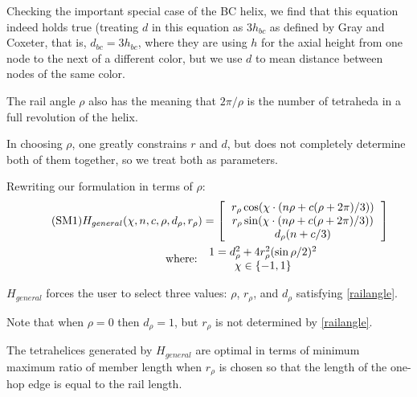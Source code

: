 \documentclass[review]{siamonline1116}
\newcommand\numberthis{\addtocounter{equation}{1}\tag{\theequation}}
\begin{document}
Checking the important special case of the BC helix, we find that this equation
indeed holds true (treating $d$ in this equation as $3 h_{bc}$ as defined by
Gray and Coxeter, that is, $d_{bc} = 3h_{bc}$, where they are using
$h$ for the axial height from one node to
the next of a different color, but we use $d$ to mean distance between nodes of
the  same color.

The rail angle $\rho$ also has the meaning that $2 \pi / \rho$ is the number of
tetraheda in a full revolution of the helix.

In choosing $\rho$, one greatly constrains $r$ and $d$, but does not completely
determine both of them together, so we treat both as parameters.

Rewriting our formulation in terms of $\rho$:
\begin{align*}
\numberthis  \label{eq:general}  
H_{general}(\chi,n,c,\rho,d_{\rho},r_{\rho}) &= 
 \left [
  \begin{tabular}{c}
   $ r_{\rho} \cos(\chi \cdot (n \rho + c(\rho +  2 \pi) /3)) $\\
   $ r_{\rho}  \sin(\chi \cdot (n \rho + c(\rho +  2 \pi) /3)) $\\
   $ d_{\rho} (n + c /3) $
  \end{tabular}
  \right ] \\
\text{where: } &
\begin{tabular}{c}
  $   1 = d_{\rho}^2 + 4 r_{\rho}^2 (\sin{ \rho / 2})^2 $ \\
    $\chi \in \{-1,1\}$ \\  
\end{tabular}
\end{align*} 


$H_{general}$ forces the user to select three values: $\rho$, $r_{\rho}$, and $d_{\rho}$ satisfying \eqref{railangle}.

Note that when $\rho = 0$ then $d_{\rho} = 1$, but $r_{\rho}$ is not determined by
\cref{railangle}.

\begin{theorem}
  \label{generalformulaoptimal}
  The tetrahelices generated by $H_{general}$ are optimal in terms of minimum maximum ratio of member length when $r_{\rho}$ is chosen so that
  the length of the one-hop edge is equal to the rail length.
\end{theorem}
\end{document}
